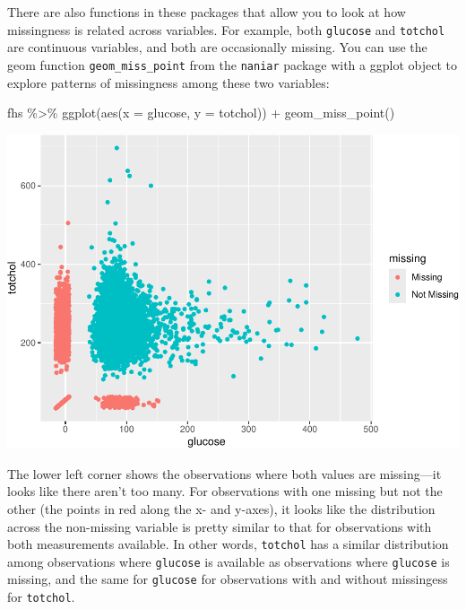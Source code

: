 \documentclass[
]{book}
\newenvironment{Shaded}{\begin{snugshade}}{\end{snugshade}}
\newcommand{\AttributeTok}[1]{\textcolor[rgb]{0.77,0.63,0.00}{#1}}
\newcommand{\FunctionTok}[1]{\textcolor[rgb]{0.00,0.00,0.00}{#1}}
\newcommand{\NormalTok}[1]{#1}
\newcommand{\SpecialCharTok}[1]{\textcolor[rgb]{0.00,0.00,0.00}{#1}}
\begin{document}
There are also functions in these packages that allow you to look at how
missingness is related across variables. For example, both \texttt{glucose} and
\texttt{totchol} are continuous variables, and both are occasionally missing. You
can use the geom function \texttt{geom\_miss\_point} from the \texttt{naniar} package
with a ggplot object to explore patterns of missingness among these two
variables:

\begin{Shaded}
\begin{Highlighting}[]
\NormalTok{fhs }\SpecialCharTok{\%\textgreater{}\%} 
  \FunctionTok{ggplot}\NormalTok{(}\FunctionTok{aes}\NormalTok{(}\AttributeTok{x =}\NormalTok{ glucose, }\AttributeTok{y =}\NormalTok{ totchol)) }\SpecialCharTok{+} 
  \FunctionTok{geom\_miss\_point}\NormalTok{()}
\end{Highlighting}
\end{Shaded}

\includegraphics{adv_epi_analysis_files/figure-latex/unnamed-chunk-177-1.pdf}

The lower left corner shows the observations where both values are missing---it
looks like there aren't too many. For observations with one missing but not the
other (the points in red along the x- and y-axes), it looks like the distribution
across the non-missing variable is pretty similar to that for observations
with both measurements available. In other words, \texttt{totchol} has a similar
distribution among observations where \texttt{glucose} is available as observations
where \texttt{glucose} is missing, and the same for \texttt{glucose} for observations with and without missingess for \texttt{totchol}.
\end{document}
